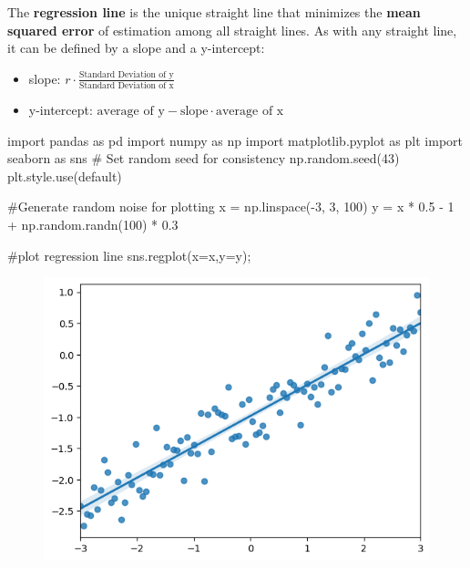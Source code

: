 \documentclass[
  letterpaper,
  DIV=11,
  numbers=noendperiod]{scrreprt}
\newenvironment{Shaded}{\begin{snugshade}}{\end{snugshade}}
\newcommand{\CommentTok}[1]{\textcolor[rgb]{0.37,0.37,0.37}{#1}}
\newcommand{\DecValTok}[1]{\textcolor[rgb]{0.68,0.00,0.00}{#1}}
\newcommand{\FloatTok}[1]{\textcolor[rgb]{0.68,0.00,0.00}{#1}}
\newcommand{\ImportTok}[1]{\textcolor[rgb]{0.00,0.46,0.62}{#1}}
\newcommand{\NormalTok}[1]{\textcolor[rgb]{0.00,0.23,0.31}{#1}}
\newcommand{\OperatorTok}[1]{\textcolor[rgb]{0.37,0.37,0.37}{#1}}
\newcommand{\StringTok}[1]{\textcolor[rgb]{0.13,0.47,0.30}{#1}}
\providecommand{\tightlist}{%
  \setlength{\itemsep}{0pt}\setlength{\parskip}{0pt}}\usepackage{longtable,booktabs,array}
\begin{document}
The \textbf{regression line} is the unique straight line that minimizes
the \textbf{mean squared error} of estimation among all straight lines.
As with any straight line, it can be defined by a slope and a
y-intercept:

\begin{itemize}
\tightlist
\item
  slope:
  \(r \cdot \frac{\text{Standard Deviation of y}}{\text{Standard Deviation of x}}\)
\item
  y-intercept:
  \(\text{average of y} - \text{slope}\cdot\text{average of x}\)
\end{itemize}

\begin{Shaded}
\begin{Highlighting}[]
\ImportTok{import}\NormalTok{ pandas }\ImportTok{as}\NormalTok{ pd}
\ImportTok{import}\NormalTok{ numpy }\ImportTok{as}\NormalTok{ np}
\ImportTok{import}\NormalTok{ matplotlib.pyplot }\ImportTok{as}\NormalTok{ plt}
\ImportTok{import}\NormalTok{ seaborn }\ImportTok{as}\NormalTok{ sns}
\CommentTok{\# Set random seed for consistency }
\NormalTok{np.random.seed(}\DecValTok{43}\NormalTok{)}
\NormalTok{plt.style.use(}\StringTok{\textquotesingle{}default\textquotesingle{}}\NormalTok{) }

\CommentTok{\#Generate random noise for plotting}
\NormalTok{x }\OperatorTok{=}\NormalTok{ np.linspace(}\OperatorTok{{-}}\DecValTok{3}\NormalTok{, }\DecValTok{3}\NormalTok{, }\DecValTok{100}\NormalTok{)}
\NormalTok{y }\OperatorTok{=}\NormalTok{ x }\OperatorTok{*} \FloatTok{0.5} \OperatorTok{{-}} \DecValTok{1} \OperatorTok{+}\NormalTok{ np.random.randn(}\DecValTok{100}\NormalTok{) }\OperatorTok{*} \FloatTok{0.3}

\CommentTok{\#plot regression line}
\NormalTok{sns.regplot(x}\OperatorTok{=}\NormalTok{x,y}\OperatorTok{=}\NormalTok{y)}\OperatorTok{;}
\end{Highlighting}
\end{Shaded}

\begin{figure}[H]

{\centering \includegraphics{intro_to_modeling/intro_to_modeling_files/figure-pdf/cell-2-output-1.png}

}

\end{figure}
\end{document}
